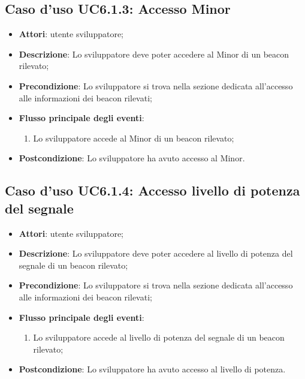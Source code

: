 \documentclass[../AnalisiDeiRequisiti.tex]{subfiles}
\begin{document}
\subsection{Caso d'uso UC6.1.3: Accesso Minor}
\begin{itemize}
	\item \textbf{Attori}: utente sviluppatore;
	\item \textbf{Descrizione}: Lo sviluppatore deve poter accedere al Minor di un beacon rilevato; 
	\item \textbf{Precondizione}: Lo sviluppatore si trova nella sezione dedicata all'accesso alle informazioni dei beacon rilevati;
	
	\item \textbf{Flusso principale degli eventi}:
	\begin{enumerate}
		\item Lo sviluppatore accede al Minor di un beacon rilevato;
		
	\end{enumerate}
	\item \textbf{Postcondizione}: Lo sviluppatore ha avuto accesso al Minor.
\end{itemize}
\hypertarget{UC6.1.4}{}
\subsection{Caso d'uso UC6.1.4: Accesso livello di potenza del segnale}
\begin{itemize}
	\item \textbf{Attori}: utente sviluppatore;
	\item \textbf{Descrizione}: Lo sviluppatore deve poter accedere al livello di potenza del segnale di un beacon rilevato; 
	\item \textbf{Precondizione}: Lo sviluppatore si trova nella sezione dedicata all'accesso alle informazioni dei beacon rilevati;
	
	\item \textbf{Flusso principale degli eventi}:
	\begin{enumerate}
		\item Lo sviluppatore accede al livello di potenza del segnale di un beacon rilevato;
		
	\end{enumerate}
	\item \textbf{Postcondizione}: Lo sviluppatore ha avuto accesso al livello di potenza.
\end{itemize}
\hypertarget{UC6.1.5}{}
\end{document}
